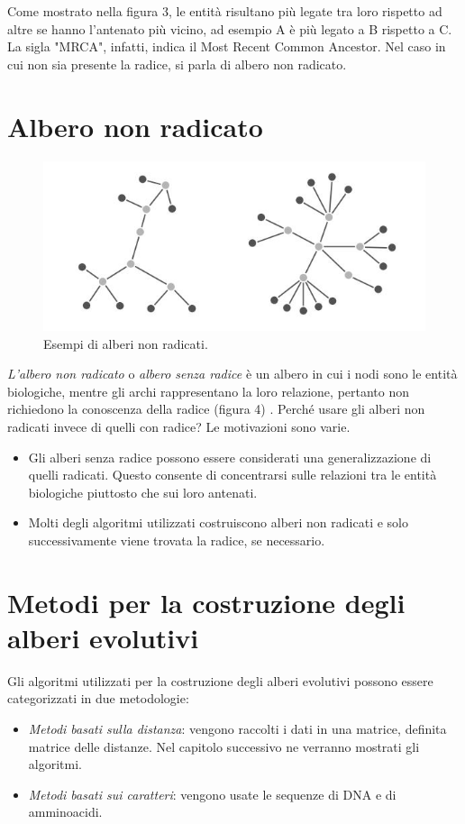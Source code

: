 \newline
Come mostrato nella figura 3, le entità risultano più legate tra loro rispetto ad altre se hanno l'antenato più vicino, ad esempio A è più legato a B rispetto a C. La sigla "MRCA", infatti, indica il Most Recent Common Ancestor.
\newline
Nel caso in cui non sia presente la radice, si parla di albero non radicato.
\newpage

\section{Albero non radicato}
\begin{figure}[h!]
	\includegraphics[width=\linewidth]{unrooted_trees.jpg}
 	\caption{Esempi di alberi non radicati.}
  	\label{fig:RootedTree}
\end{figure}
\textit{L'albero non radicato} o \textit{albero senza radice} è un albero in cui i nodi sono le entità biologiche, mentre gli archi rappresentano la loro relazione, pertanto non richiedono la conoscenza della radice (figura 4) \cite{bioinfalganactivelearningapproachparttwo}.
\newline
Perché usare gli alberi non radicati invece di quelli con radice? Le motivazioni sono varie.
\begin{itemize}
	\item Gli alberi senza radice possono essere considerati una generalizzazione di quelli radicati. Questo consente di concentrarsi sulle relazioni tra le entità biologiche piuttosto che sui loro antenati.
	\item Molti degli algoritmi utilizzati costruiscono alberi non radicati e solo successivamente viene trovata la radice, se necessario.
\end{itemize}


\section{Metodi per la costruzione degli alberi evolutivi}
Gli algoritmi utilizzati per la costruzione degli alberi evolutivi possono essere categorizzati in due metodologie:
\begin{itemize}
	\item \textit{Metodi basati sulla distanza}: vengono raccolti i dati in una matrice, definita matrice delle distanze. Nel capitolo successivo ne verranno mostrati gli algoritmi.
	\item \textit{Metodi basati sui caratteri}: vengono usate le sequenze di DNA e di amminoacidi.
\end{itemize}